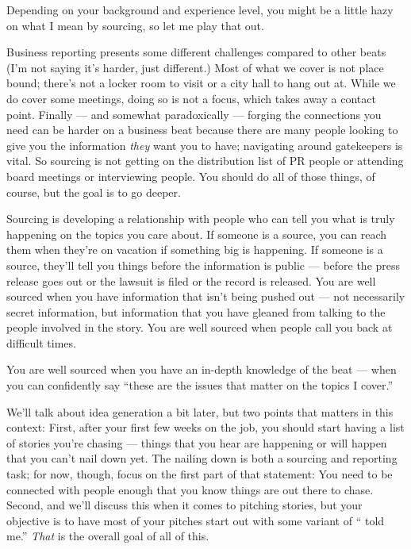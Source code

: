 \documentclass[
  11pt,
  american,
  letterpaperpaper,
  extrafontsizes,onecolumn,openright
  ]{memoir}
\begin{document}
Depending on your background and experience level, you might be a little hazy on what I mean by sourcing, so let me play that out.

Business reporting presents some different challenges compared to other beats (I'm not saying it's harder, just different.) Most of what we cover is not place bound; there's not a locker room to visit or a city hall to hang out at. While we do cover some meetings, doing so is not a focus, which takes away a contact point. Finally --- and somewhat paradoxically --- forging the connections you need can be harder on a business beat because there are many people looking to give you the information \emph{they} want you to have; navigating around gatekeepers is vital.
So sourcing is not getting on the distribution list of PR people or attending board meetings or interviewing people. You should do all of those things, of course, but the goal is to go deeper.

Sourcing is developing a relationship with people who can tell you what is truly happening on the topics you care about. If someone is a source, you can reach them when they're on vacation if something big is happening. If someone is a source, they'll tell you things before the information is public --- before the press release goes out or the lawsuit is filed or the record is released. You are well sourced when you have information that isn't being pushed out --- not necessarily secret information, but information that you have gleaned from talking to the people involved in the story. You are well sourced when people call you back at difficult times.

You are well sourced when you have an in-depth knowledge of the beat --- when you can confidently say \enquote{these are the issues that matter on the topics I cover.}

We'll talk about idea generation a bit later, but two points that matters in this context: First, after your first few weeks on the job, you should start having a list of stories you're chasing --- things that you hear are happening or will happen that you can't nail down yet. The nailing down is both a sourcing and reporting task; for now, though, focus on the first part of that statement: You need to be connected with people enough that you know things are out there to chase. Second, and we'll discuss this when it comes to pitching stories, but your objective is to have most of your pitches start out with some variant of \enquote{ told me.} \emph{That} is the overall goal of all of this.
\end{document}
